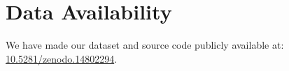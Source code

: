 \section*{Data Availability}
\label{sec:data_avail}
We have made our dataset and source code publicly available at: \hyperlink{https://doi.org/10.5281/zenodo.14802294}{10.5281/zenodo.14802294}.

